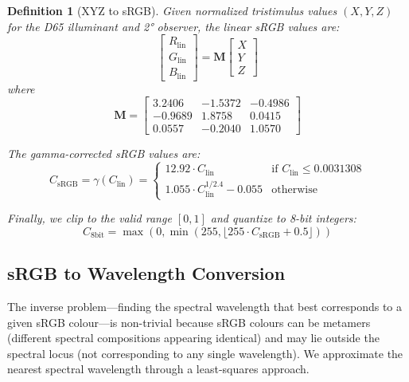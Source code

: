 \documentclass[12pt,a4paper]{article}
\newtheorem{definition}[theorem]{Definition}
\begin{document}
\begin{definition}[XYZ to sRGB]
Given normalized tristimulus values $(X, Y, Z)$ for the D65 illuminant and 2° observer, the linear sRGB values are:
\begin{equation}
\begin{bmatrix} R_{\text{lin}} \\ G_{\text{lin}} \\ B_{\text{lin}} \end{bmatrix} = 
\mathbf{M}
\begin{bmatrix} X \\ Y \\ Z \end{bmatrix}
\end{equation}
where
\begin{equation}
\mathbf{M} = 
\begin{bmatrix}
3.2406 & -1.5372 & -0.4986 \\
-0.9689 & 1.8758 & 0.0415 \\
0.0557 & -0.2040 & 1.0570
\end{bmatrix}
\end{equation}

The gamma-corrected sRGB values are:
\begin{equation}
C_{\text{sRGB}} = \gamma(C_{\text{lin}}) = \begin{cases}
12.92 \cdot C_{\text{lin}} & \text{if } C_{\text{lin}} \leq 0.0031308 \\
1.055 \cdot C_{\text{lin}}^{1/2.4} - 0.055 & \text{otherwise}
\end{cases}
\end{equation}

Finally, we clip to the valid range $[0, 1]$ and quantize to 8-bit integers:
\begin{equation}
C_{8\text{bit}} = \max(0, \min(255, \lfloor 255 \cdot C_{\text{sRGB}} + 0.5 \rfloor))
\end{equation}
\end{definition}

\subsection{sRGB to Wavelength Conversion}

The inverse problem—finding the spectral wavelength that best corresponds to a given sRGB colour—is non-trivial because sRGB colours can be metamers (different spectral compositions appearing identical) and may lie outside the spectral locus (not corresponding to any single wavelength). We approximate the nearest spectral wavelength through a least-squares approach.
\end{document}
